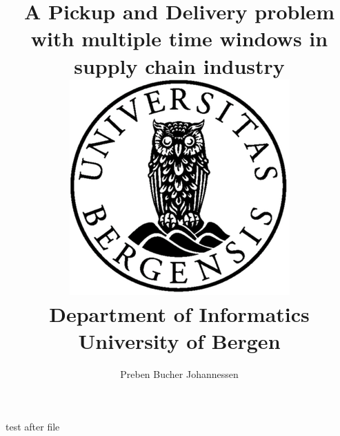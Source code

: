 \documentclass[12pt,twoside]{report}
\title{{A Pickup and Delivery problem with multiple time windows in supply chain industry}\\
{\includegraphics{uib_2.png}}\\
{\large Department of Informatics}\\
{\large University of Bergen}\\
}
\author{Preben Bucher Johannessen}
\def\biblio{}
\begin{document}
\maketitle
\def\biblio{}



\tableofcontents{}

\listoffigures{}




test after file











\appendix




\end{document}
